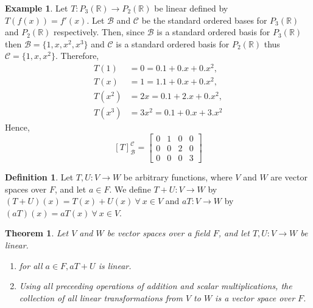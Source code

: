 \documentclass[12pt, a4paper]{article}
\newtheorem{theorem}{Theorem}[section]
\theoremstyle{definition}
\newtheorem{definition}{Definition}[section]
\newtheorem{example}{Example}[section]
\theoremstyle{remark}
\newcommand{\B}{\mathscr{B}}
\newcommand{\C}{\mathscr{C}}
\begin{document}
\begin{example}
    Let $T:P_3(\mathbb{R}) \to P_2(\mathbb{R})$ be linear defined by $T(f(x)) = f'(x)$. Let $\B$ and $\C$ be the standard ordered bases for $P_3(\mathbb{R})$ and $P_2(\mathbb{R})$ respectively. Then, since $\B$ is a standard ordered basis for $P_3(\mathbb{R})$ then $\B = \{1,x,x^2,x^3\}$ and $\C$ is a standard ordered basis for $P_2(\mathbb{R})$ thus $\C = \{1,x,x^2\}$. Therefore,
    \begin{align*}
        T(1) &= 0 = 0.1+0.x+0.x^2, \\
        T(x) &= 1 = 1.1+0.x+0.x^2, \\
        T(x^2) &= 2x = 0.1+2.x+0.x^2, \\
        T(x^3) &= 3x^2 = 0.1+0.x+3.x^2
    \end{align*}
    Hence,
    \[
    [T]_\B^\C = \left[
        \begin{matrix}
            0 & 1 & 0 & 0 \\
            0 & 0 & 2 & 0 \\
            0 & 0 & 0 & 3
        \end{matrix}
    \right]
    \]
\end{example}

\begin{definition}
    Let $T,U: V \to W$ be arbitrary functions, where $V$ and $W$ are vector spaces over $F$, and let $a \in F$. We define $T+U:V \to W$ by $(T+U)(x) = T(x) + U(x) \ \forall \ x \in V$ and $aT:V \to W$ by $(aT)(x) = aT(x) \ \forall \ x \in V$.
\end{definition}

\begin{theorem}
    Let $V$ and $W$ be vector spaces over a field $F$, and let $T,U:V \to W$ be linear.
    \begin{enumerate}
        \item for all $a \in F, aT+U$ is linear.
        \item Using all preceeding operations of addition and scalar multiplications, the collection of all linear transformations from $V$ to $W$ is a vector space over $F$.
    \end{enumerate}
\end{theorem}
\end{document}
